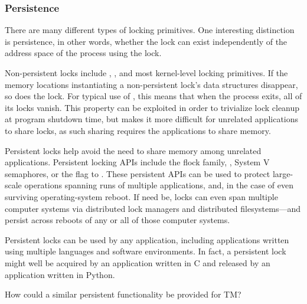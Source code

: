 \subsubsection{Persistence}
\label{sec:future:Persistence}

There are many different types of locking primitives.
One interesting distinction is persistence, in other words, whether the
lock can exist independently of the address space of the process using
the lock.

Non-persistent locks include ,
, and most kernel-level locking primitives.
If the memory locations instantiating a non-persistent lock's data
structures disappear, so does the lock.
For typical use of , this means that when the
process exits, all of its locks vanish.
This property can be exploited in order to trivialize lock cleanup
at program shutdown time, but makes it more difficult for unrelated
applications to share locks, as such sharing requires the applications
to share memory.

\QuickQuizEnd

Persistent locks help avoid the need to share memory among unrelated
applications.
Persistent locking APIs include the flock family, , System
V semaphores, or the  flag to .
These persistent APIs can be used to protect large-scale operations
spanning runs of multiple applications, and, in the case of 
even surviving operating-system reboot.
If need be, locks can even span multiple computer systems via distributed
lock managers and distributed filesystems---and persist across reboots
of any or all of those computer systems.

Persistent locks can be used by any application, including applications
written using multiple languages and software environments.
In fact, a persistent lock might well be acquired by an application written
in C and released by an application written in Python.

How could a similar persistent functionality be provided for TM?


